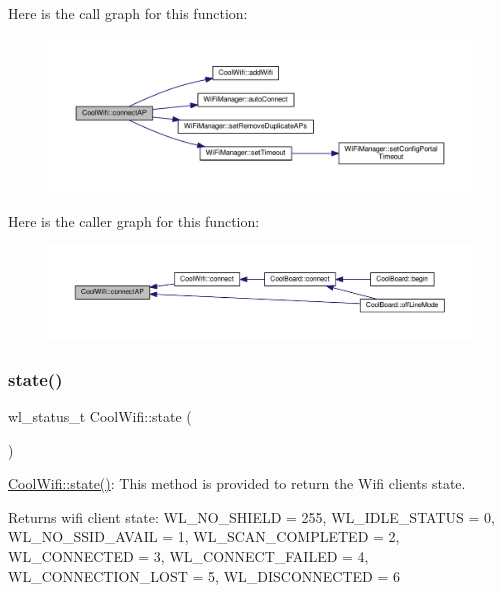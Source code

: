 Here is the call graph for this function\+:
\nopagebreak
\begin{figure}[H]
\begin{center}
\leavevmode
\includegraphics[width=350pt]{d7/d29/class_cool_wifi_a7c857f27161782f5ef1d62d552aff971_cgraph}
\end{center}
\end{figure}
Here is the caller graph for this function\+:
\nopagebreak
\begin{figure}[H]
\begin{center}
\leavevmode
\includegraphics[width=350pt]{d7/d29/class_cool_wifi_a7c857f27161782f5ef1d62d552aff971_icgraph}
\end{center}
\end{figure}
\mbox{\label{class_cool_wifi_a1c7b4d82a4098d346e7593dce92039fa}} 
\subsubsection{\texorpdfstring{state()}{state()}}
{\footnotesize\ttfamily wl\+\_\+status\+\_\+t Cool\+Wifi\+::state (\begin{DoxyParamCaption}{ }\end{DoxyParamCaption})}

\hyperlink{class_cool_wifi_a1c7b4d82a4098d346e7593dce92039fa}{Cool\+Wifi\+::state()}\+: This method is provided to return the Wifi client\textquotesingle{}s state. \begin{DoxyReturn}{Returns}
wifi client state\+: W\+L\+\_\+\+N\+O\+\_\+\+S\+H\+I\+E\+LD = 255, W\+L\+\_\+\+I\+D\+L\+E\+\_\+\+S\+T\+A\+T\+US = 0, W\+L\+\_\+\+N\+O\+\_\+\+S\+S\+I\+D\+\_\+\+A\+V\+A\+IL = 1, W\+L\+\_\+\+S\+C\+A\+N\+\_\+\+C\+O\+M\+P\+L\+E\+T\+ED = 2, W\+L\+\_\+\+C\+O\+N\+N\+E\+C\+T\+ED = 3, W\+L\+\_\+\+C\+O\+N\+N\+E\+C\+T\+\_\+\+F\+A\+I\+L\+ED = 4, W\+L\+\_\+\+C\+O\+N\+N\+E\+C\+T\+I\+O\+N\+\_\+\+L\+O\+ST = 5, W\+L\+\_\+\+D\+I\+S\+C\+O\+N\+N\+E\+C\+T\+ED = 6 
\end{DoxyReturn}


